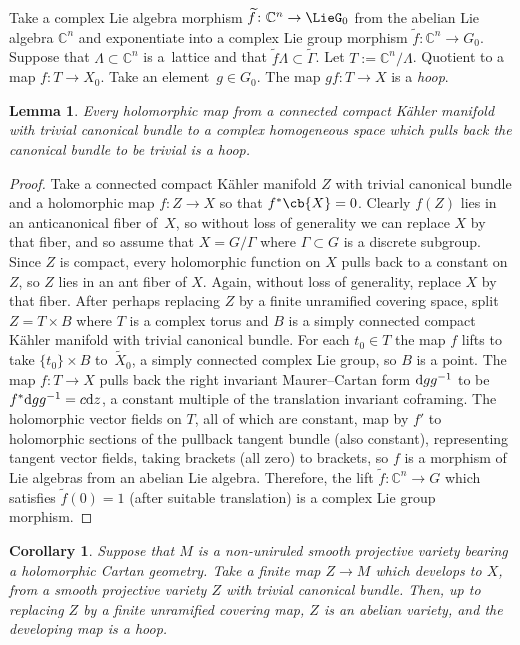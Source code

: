 \documentclass[pdftex]{sigma}
\numberwithin{equation}{section}
\newtheorem{Corollary}[Theorem]{Corollary}
\newtheorem{Lemma}[Theorem]{Lemma}
\renewcommand{\C}{\mathbb{C}}
\newcommand{\GZ}{G_0}
\newcommand{\LieGZ}{\LieG_0}
\begin{document}
Take a complex Lie algebra morphism
$
\widetilde{f} \colon \C^{n} \to \LieGZ
$
from the abelian Lie algebra $\C^{n}$ and exponentiate into a complex Lie group morphism
$
\widetilde{f} \colon \C^{n} \to \GZ.
$
Suppose that $\Lambda \subset \C^{n}$ is a~lattice and that $\widetilde{f}\Lambda \subset \widetilde{\Gamma}$.
Let $T := \C^{n}/\Lambda$.
Quotient to a map $f \colon T \to X_0$.
Take an element~${g \in \GZ}$.
The map $gf \colon T \to X$ is a \emph{hoop}.

\begin{Lemma}\label{lemma:is.a.hoop}
Every holomorphic map from a connected compact K\"ahler manifold with trivial canonical bundle to a complex homogeneous space which pulls back the canonical bundle to be trivial is a hoop.
\end{Lemma}

\begin{proof}
Take a connected compact K\"ahler manifold $Z$ with trivial canonical bundle and a holomorphic map $f \colon Z \to X$ so that $f^* \cb{X}=0$.
Clearly $f(Z)$ lies in an anticanonical fiber of~$X$, so without loss of generality we can replace $X$ by that fiber, and so assume that $X=G/\Gamma$ where $\Gamma \subset G$ is a discrete subgroup.
Since $Z$ is compact, every holomorphic function on $X$ pulls back to a constant on $Z$, so $Z$ lies in an ant fiber of $X$.
Again, without loss of generality, replace $X$ by that fiber.
After perhaps replacing $Z$ by a finite unramified covering space, split~$Z = T \times B$ where $T$ is a complex torus and $B$ is a simply connected compact K\"ahler manifold with trivial canonical bundle.
For each $t_0 \in T$ the map $f$ lifts to take $\{t_0\} \times B$ to~$\widetilde{X}_0$, a simply connected complex Lie group, so $B$ is a point.
The map $f \colon T \to X$ pulls back the right invariant Maurer--Cartan form ${\rm d}g g^{-1}$ to be $f^* {\rm d}g g^{-1}
 = c {\rm d}z$, a constant multiple of the translation invariant coframing.
The holomorphic vector fields on $T$, all of which are constant, map by $f'$ to holomorphic sections of the pullback tangent bundle (also constant), representing tangent vector fields, taking brackets (all zero) to brackets, so $f$ is a morphism of Lie algebras from an abelian Lie algebra.
Therefore, the lift $\widetilde{f} \colon \C^{n} \to G$ which satisfies $\widetilde{f}(0)=1$ (after suitable translation) is a complex Lie group morphism.
\end{proof}
\begin{Corollary}\label{corollary:hoops}
Suppose that $M$ is a non-uniruled smooth projective variety bearing a holomorphic Cartan geometry.
Take a finite map $Z \to M$ which develops to $X$, from a smooth projective variety $Z$ with trivial canonical bundle.
Then, up to replacing $Z$ by a finite unramified covering map, $Z$ is an abelian variety, and the developing map is a hoop.
\end{Corollary}
\end{document}
